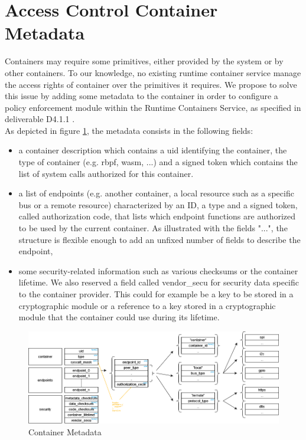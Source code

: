 \documentclass[../main.tex]{subfiles}
\begin{document}
	

\section{Access Control Container Metadata}

Containers may require some primitives, either provided by the system or by other containers. To our knowledge, no existing runtime container service manage the access rights of container over the primitives it requires. We propose to solve this issue by adding some metadata to the container in order to configure a policy enforcement module within the Runtime Containers Service, as specified in deliverable D4.1.1 \cite{TinyPART-d411}.\\

As depicted in figure \ref{fig:metadata}, the metadata consists in the following fields:
\begin{itemize}
	\item a container description which contains a uid identifying the container, the type of container (e.g. rbpf, wasm, ...) and a signed token which contains the list of system calls authorized for this container.
	\item a list of endpoints (e.g. another container, a local resource such as a specific bus or a remote resource) characterized by an ID, a type and a signed token, called authorization code, that lists which endpoint functions are authorized to be used by the current container. As illustrated with the fields "...", the structure is flexible enough to add an unfixed number of fields to describe the endpoint,
	\item some security-related information such as various checksums or the container lifetime. We also reserved a field called vendor\_secu for security data specific to the container provider. This could for example be a key to be stored in a cryptographic module or a reference to a key stored in a cryptographic module that the container could use during its lifetime.  
\end{itemize}  


\begin{figure}[hbt!]
	\centering
	\includegraphics[width=\linewidth]{images/metadata.png}
	\caption{Container Metadata}
	\label{fig:metadata}
\end{figure}
\end{document}
